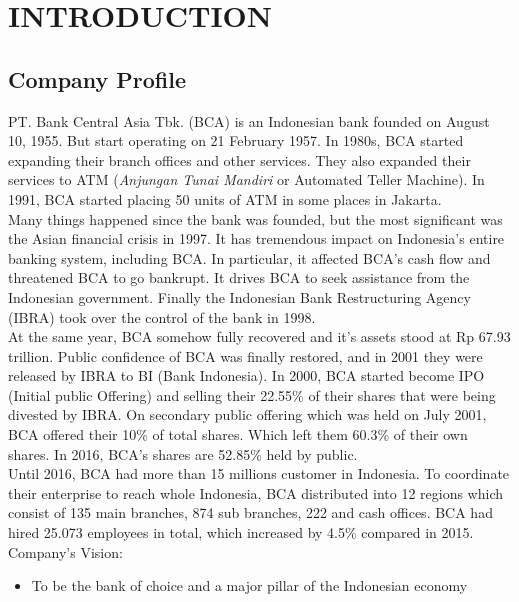 \chapter{INTRODUCTION}
\section{Company Profile}
PT. Bank Central Asia Tbk. (BCA) is an Indonesian bank founded on August 10, 1955. But start operating on 21 February 1957. In 1980s, BCA started expanding their branch offices and other services. They also expanded their services to ATM (\textit{Anjungan Tunai Mandiri} or Automated Teller Machine). In 1991, BCA started placing 50 units of ATM in some places in Jakarta.\\

Many things happened since the bank was founded, but the most significant was the Asian financial crisis in 1997. It has tremendous impact on Indonesia's entire banking system, including BCA. In particular, it affected BCA's cash flow and threatened BCA to go bankrupt. It drives BCA to seek assistance from the Indonesian government. Finally the Indonesian Bank Restructuring Agency (IBRA) took over the control of the bank in 1998.\\

At the same year, BCA somehow fully recovered and it's assets stood at Rp 67.93 trillion. Public confidence of BCA was finally restored, and in 2001 they were released by IBRA to BI (Bank Indonesia). In 2000, BCA started become IPO (Initial public Offering) and selling their 22.55\% of their shares that were being divested by IBRA. On secondary public offering which was held on July 2001, BCA offered their 10\% of total shares. Which left them 60.3\% of their own shares. In 2016, BCA's shares are 52.85\% held by public.\\

Until 2016, BCA had more than 15 millions customer in Indonesia. To coordinate their enterprise to reach whole Indonesia, BCA distributed into 12 regions which consist of 135 main branches, 874 sub branches, 222 and cash offices. BCA had hired 25.073 employees in total, which increased by 4.5\% compared in 2015.\\

Company's Vision:
\begin{itemize}
	\itemsep0em
    \item To be the bank of choice and a major pillar of the Indonesian economy
\end{itemize}

